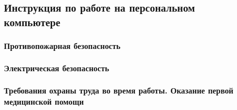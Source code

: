 \subsection{Инструкция по работе на персональном компьютере}

\subsubsection{Противопожарная безопасность}

\subsubsection{Электрическая безопасность}

\subsubsection{Требования охраны труда во время работы. Оказание первой медицинской помощи}